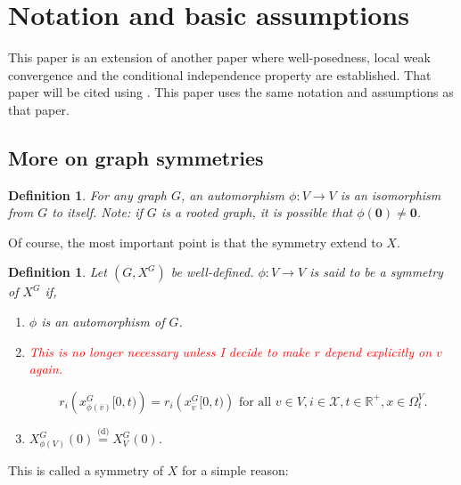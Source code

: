 \documentclass[12pt]{article}
\newcommand{\mb}{\mathbb}
\newcommand{\mc}{\mathcal}
\newcommand{\ra}{\rightarrow}
\newcommand{\ov}{\overline}
\newcommand{\te}{\text}
\newcommand{\tr}{\textcolor{red}}
\newcommand{\deq}{\overset{\text{(d)}}{=}}			%
\newcommand{\sta}{\mc{X}}							%
\newcommand{\cl}[1]{\ov{#1}}						%
\renewcommand{\root}{\mathbf{0}}					%
\newcommand{\Xf}{X}									%
\newcommand{\rate}{r}								%
\newcommand{\xf}{x}									%
\newcommand{\vind}[1]{_{#1}}						%
\newcommand{\tme}[1]{(#1)}							%
\newcommand{\tmi}[1]{#1}							%
\newcommand{\gind}[1]{^{#1}}						%
\newcommand{\vpara}[1]{^{#1}}						%
\newcommand{\stpara}[1]{_{#1}}						%
\newcommand{\tpara}[1]{_{#1}}						%
\newtheorem{defn}[thms]{Definition}
\begin{document}
\section{Notation and basic assumptions}
\label{not}

This paper is an extension of another paper where well-posedness, local weak convergence and the conditional independence property are established. That paper will be cited using \cite{F}. This paper uses the same notation and assumptions as that paper.

\subsection{More on graph symmetries}

\begin{defn}
For any graph \(G\), an automorphism \(\phi: V \ra V\) is an isomorphism from \(G\) to itself. Note: if \(G\) is a rooted graph, it is possible that \(\phi(\root) \neq \root\).
\label{a:siso}
\end{defn}

Of course, the most important point is that the symmetry extend to \(\Xf\).

\begin{defn}
Let \((G,\Xf\gind{G})\) be well-defined. \(\phi: V \ra V\) is said to be a symmetry of \(\Xf\gind{G}\) if,

\begin{enumerate}
\item \(\phi\) is an automorphism of \(G\).

\item  \tr{This is no longer necessary unless I decide to make \(\rate\) depend explicitly on \(v\) again.}

\begin{equation}
\rate\stpara{i}\left(\xf\gind{G}\vind{\phi(\cl{v})}\tmi{[0,t)}\right) = \rate\stpara{i}\left(\xf\gind{G}\vind{\cl{v}}\tmi{[0,t)}\right) \te{ for all } v \in V,i \in \sta, t \in \mb{R}^+, \xf\in \Omega\vpara{V}\tpara{t}.
\label{a::ratesym}
\end{equation}

\item \(\Xf\gind{G}\vind{\phi(V)}\tme{0} \deq \Xf\gind{G}\vind{V}\tme{0}\).
\end{enumerate}
\label{a:Xsim}
\end{defn}

This is called a symmetry of \(\Xf\) for a simple reason:
\end{document}
